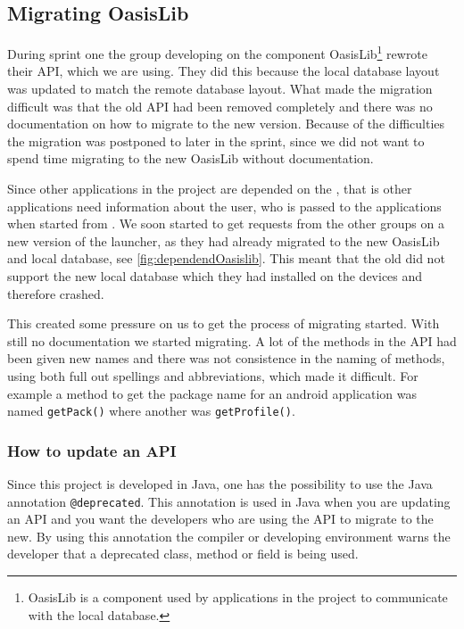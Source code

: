 \subsection{Migrating OasisLib}\label{sec:oasismigration}
During sprint one the group developing on the component OasisLib\footnote{OasisLib is a component used by applications in the \giraf project to communicate with the local database.} rewrote their API, which we are using.
They did this because the local database layout was updated to match the remote database layout.
What made the migration difficult was that the old API had been removed completely and there was no documentation on how to migrate to the new version.
Because of the difficulties the migration was postponed to later in the sprint, since we did not want to spend time migrating to the new OasisLib without documentation.

Since other applications in the \giraf project are depended on the \launcher, that is other applications need information about the user, who is passed to the applications when started from \launcher.
We soon started to get requests from the other groups on a new version of the launcher, as they had already migrated to the new OasisLib and local database, see \cref{fig:dependendOasislib}.
This meant that the old \launcher did not support the new local database which they had installed on the devices and therefore crashed.


This created some pressure on us to get the process of migrating started.
With still no documentation we started migrating. A lot of the methods in the API had been given new names and there was not consistence in the naming of methods, using both full out spellings and abbreviations, which made it difficult.
For example a method to get the package name for an android application was named \lstinline{getPack()} where another was \lstinline{getProfile()}.

\subsubsection{How to update an API}
Since this project is developed in Java, one has the possibility to use the Java annotation \lstinline{@deprecated}.
This annotation is used in Java when you are updating an API and you want the developers who are using the API to migrate to the new.
By using this annotation the compiler or developing environment warns the developer that a deprecated class, method or field is being used.

